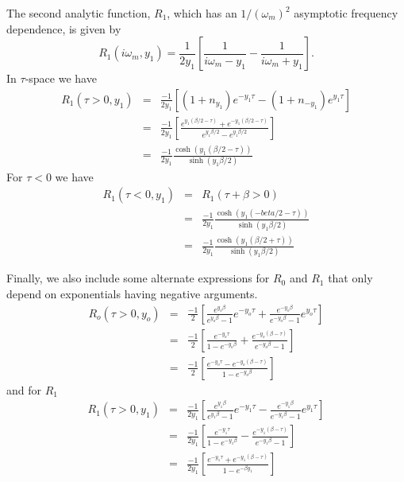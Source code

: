 The second analytic function, $R_1$, which has an
$1 / (\omega_m)^2$ asymptotic frequency dependence, is
given by
\begin{equation}
R_1(i\omega_m, y_1) = \frac{1}{2 y_1}
\left[ \frac{1}{i \omega_m - y_1} - \frac{1}{i\omega_m + y_1} \right].
\end{equation}
In $\tau$-space we have
\begin{eqnarray}
R_1(\tau > 0, y_1) & = & 
\frac{-1}{2 y_1} \left[ (1 + n_{y_1})e^{-y_1 \tau} -
(1 + n_{-y_1})e^{y_1 \tau} \right] \\
& = & \frac{-1}{2 y_1} 
\left[ \frac{e^{y_1(\beta/2 - \tau)} + e^{-y_1(\beta/2 - \tau)}}
{e^{y_1 \beta /2 } - e^{y_1 \beta / 2}} \right] \\
& = & \frac{-1}{2 y_1} \frac{\cosh(y_1(\beta/2 - \tau))}
{\sinh(y_1 \beta / 2)}
\end{eqnarray}
For $\tau < 0$ we have
\begin{eqnarray}
R_1(\tau < 0, y_1) & = & R_1(\tau + \beta > 0) \\
& = & \frac{-1}{2 y_1} \frac{\cosh(y_1(-beta/2 - \tau))}
{\sinh(y_1 \beta / 2)} \\
& = & \frac{-1}{2 y_1} \frac{\cosh(y_1(\beta/2 + \tau))}
{\sinh(y_1 \beta /2)}
\end{eqnarray} 

Finally, we also include some alternate expressions for $R_0$
and $R_1$ that only depend on exponentials having negative
arguments.
\begin{eqnarray}
R_o(\tau > 0, y_o) & = & \frac{-1}{2}
\left[ \frac{e^{y_o \beta}}{e^{y_o \beta} - 1} e^{-y_o \tau}
+ \frac{e^{-y_o \beta}}{e^{-y_o \beta} - 1} e^{y_o \tau} \right] \\
& = & \frac{-1}{2} \left[ \frac{e^{-y_o \tau}}{1 - e^{-y_o \beta}}
+ \frac{e^{-y_o(\beta - \tau)}}{e^{-y_o \beta} - 1} \right] \\
& = & \frac{-1}{2} \left[ \frac{e^{-y_o \tau} -
e^{-y_o(\beta - \tau)}}{1 - e^{-y_o \beta}} \right ]
\end{eqnarray}
and for $R_1$
\begin{eqnarray}
R_1(\tau >0, y_1) & = & \frac{-1}{2 y_1}
\left[ \frac{e^{y_1 \beta}}{e^{y_1 \beta} - 1} e^{-y_1 \tau}
- \frac{e^{-y_1 \beta}}{e^{-y_1 \beta} - 1} e^{y_1 \tau} \right] \\
& = & \frac{-1}{2 y_1} 
\left[ \frac{e^{-y_1 \tau}}{1 - e^{-y_1 \beta}} -
\frac{e^{-y_1(\beta - \tau)}}{e^{-y_1 \beta} - 1} \right] \\
& = & \frac{-1}{2 y_1} \left[ \frac{e^{-y_1 \tau} +
e^{-y_1(\beta - \tau)}}{1 - e^{-\beta y_1}} \right]
\end{eqnarray}





